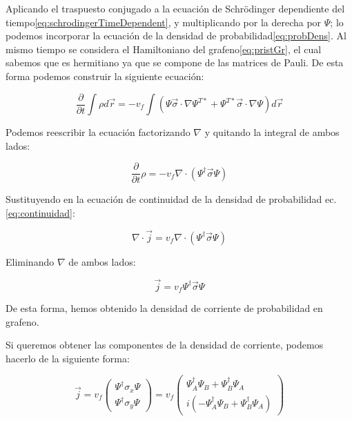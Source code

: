 Aplicando el traspuesto conjugado a la ecuación de Schrödinger dependiente del tiempo\eqref{eq:schrodingerTimeDependent}, y multiplicando por la derecha por $\Psi$; lo podemos incorporar la ecuación de la densidad de probabilidad\eqref{eq:probDens}.
Al mismo tiempo se considera el Hamiltoniano del grafeno\eqref{eq:pristGr}, el cual sabemos que es hermitiano ya que se compone de las matrices de Pauli.
De esta forma podemos construir la siguiente ecuación:

\begin{equation}
    \label{eq:rho_sigma_nabla}
    \frac{\partial}{\partial t}\int\rho d\vec{r} = -v_f\int\left( \Psi\vec{\sigma}\cdot\nabla\Psi^{T*} + \Psi^{T*}\vec{\sigma}\cdot\nabla\Psi \right)d\vec{r}
\end{equation}

Podemos reescribir la ecuación factorizando $\nabla$ y quitando la integral de ambos lados:

\begin{equation}
    \label{eq:casi_j}
    \frac{\partial}{\partial t}\rho = -v_f\nabla\cdot\left( \Psi^\dagger \vec{\sigma} \Psi \right)
\end{equation}

Sustituyendo en la ecuación de continuidad de la densidad de probabilidad ec.\eqref{eq:continuidad}:

\begin{equation}
    \label{eq:nablaJ}
    \nabla\cdot\vec{j} = v_f\nabla\cdot\left( \Psi^\dagger \vec{\sigma} \Psi \right)
\end{equation}

Eliminando $\nabla$ de ambos lados:

\begin{equation}
    \label{eq:final}
    \vec{j} = v_f\Psi^\dagger \vec{\sigma} \Psi
\end{equation}

De esta forma, hemos obtenido la densidad de corriente de probabilidad en grafeno.

Si queremos obtener las componentes de la densidad de corriente, podemos hacerlo de la siguiente forma:

\begin{equation}
    \label{eq:componentes}
    \vec{j} = v_f\begin{pmatrix}
                     \Psi^\dagger \sigma_x \Psi \\ \Psi^\dagger \sigma_y \Psi
    \end{pmatrix} = v_f\begin{pmatrix}
                           \Psi_A^\dagger\Psi_B + \Psi_B^\dagger\Psi_A \\ i(-\Psi_A^\dagger\Psi_B + \Psi_B^\dagger\Psi_A)
    \end{pmatrix}
\end{equation}

